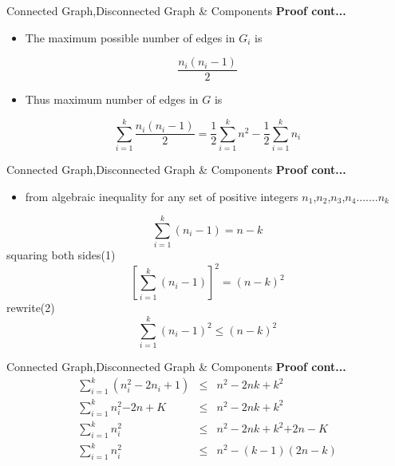 \documentclass{beamer}
\begin{document}
\begin{frame}{Connected Graph,Disconnected Graph \& Components}
	\textbf{Proof cont...}
	\begin{itemize}
		\item The maximum possible number of edges in $G_i$ is
	\end{itemize}
$$\frac{n_i(n_i-1)}{2}$$
\begin{itemize}
	\item Thus maximum number of edges in $G$ is
\end{itemize}
$$\sum_{i=1}^{k}{\frac{n_i(n_i-1)}{2}}=\frac{1}{2}\sum_{i=1}^{k}{n^2}-\frac{1}{2}\sum_{i=1}^{k}{n_i}$$
\end{frame}
\begin{frame}{Connected Graph,Disconnected Graph \& Components}
	\textbf{Proof cont...}
	\begin{itemize}
		\item from algebraic inequality for any set of positive integers $n_1$,$n_2$,$n_3$,$n_4$.......$n_k$
	\end{itemize}
\setcounter{equation}{0}
\begin{equation} 
\sum_{i=1}^{k}{(n_i-1)}= n-k
\end{equation}
squaring both sides(1)
\begin{equation}
	\left[\sum_{i=1}^{k}{(n_i-1)}\right]^2= (n-k)^2
\end{equation}
rewrite(2)
\begin{equation}
\sum_{i=1}^{k}{(n_i-1)^2}\leq (n-k)^2
\end{equation}
\end{frame}
\begin{frame}{Connected Graph,Disconnected Graph \& Components}
	\textbf{Proof cont...}
		\begin{eqnarray}
		\sum_{i=1}^{k}{(n_i^2-2n_i+1)}&\leq& n^2-2nk+k^2\\
			\sum_{i=1}^{k}{n_i^2}{-2n+K}&\leq& n^2-2nk+k^2\\
				\sum_{i=1}^{k}{n_i^2}&\leq& n^2-2nk+k^2{+2n-K}\\
			\sum_{i=1}^{k}{n_i^2}&\leq& n^2-(k-1)(2n-k)
	\end{eqnarray}
\end{frame}
\end{document}
